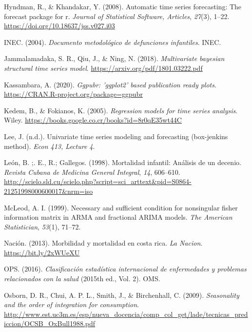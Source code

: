 \documentclass[
]{article}
\newlength{\cslhangindent}
\newlength{\cslentryspacingunit} %
\newenvironment{CSLReferences}[2] %
 {%
  \setlength{\parindent}{0pt}
  \ifodd #1
  \let\oldpar\par
  \def\par{\hangindent=\cslhangindent\oldpar}
  \fi
  \setlength{\parskip}{#2\cslentryspacingunit}
 }%
 {}
\begin{document}
\begin{CSLReferences}{1}{0}
\leavevmode{}%
Hyndman, R., \& Khandakar, Y. (2008). Automatic time series forecasting:
The forecast package for r. \emph{Journal of Statistical Software,
Articles}, \emph{27}(3), 1--22.
\url{https://doi.org/10.18637/jss.v027.i03}

\leavevmode{}%
INEC. (2004). \emph{Documento metodológico de defunciones infantiles}.
INEC.

\leavevmode{}%
Jammalamadaka, S. R., Qiu, J., \& Ning, N. (2018). \emph{Multivariate
bayesian structural time series model}.
\url{https://arxiv.org/pdf/1801.03222.pdf}

\leavevmode{}%
Kassambara, A. (2020). \emph{Ggpubr: 'ggplot2' based publication ready
plots}. \url{https://CRAN.R-project.org/package=ggpubr}

\leavevmode{}%
Kedem, B., \& Fokianos, K. (2005). \emph{Regression models for time
series analysis}. Wiley.
\url{https://books.google.co.cr/books?id=8r0qE35wt44C}

\leavevmode{}%
Lee, J. (n.d.). Univariate time series modeling and forecasting
(box-jenkins method). \emph{Econ 413, Lecture 4}.

\leavevmode{}%
León, B. ;. E., R.; Gallegos. (1998). {Mortalidad infantil: Análisis de
un decenio}. \emph{{Revista Cubana de Medicina General Integral}},
\emph{14}, 606--610.
\url{http://scielo.sld.cu/scielo.php?script=sci_arttext\&pid=S0864-21251998000600017\&nrm=iso}

\leavevmode{}%
McLeod, A. I. (1999). Necessary and sufficient condition for nonsingular
fisher information matrix in ARMA and fractional ARIMA models. \emph{The
American Statistician}, \emph{53}(1), 71--72.

\leavevmode{}%
Nación. (2013). Morbilidad y mortalidad en costa rica. \emph{La Nacion}.
\url{https://bit.ly/2xWUeXU}

\leavevmode{}%
OPS. (2016). \emph{Clasificación estadística internacional de
enfermedades y problemas relacionados con la salud} (2015th ed., Vol.
2). OMS.

\leavevmode{}%
Osborn, D. R., Chui, A. P. L., Smith, J., \& Birchenhall, C. (2009).
\emph{Seasonality and the order of integration for consumption}.
\url{http://www.est.uc3m.es/esp/nueva_docencia/comp_col_get/lade/tecnicas_prediccion/OCSB_OxBull1988.pdf}


\end{CSLReferences}
\end{document}
